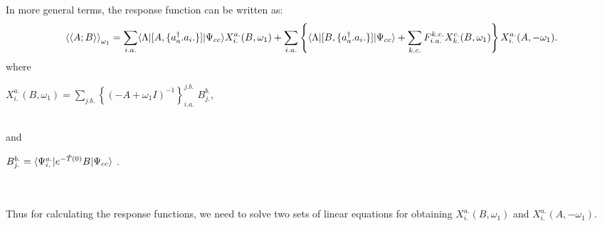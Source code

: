 In more general terms, the response function can be written as:
\begin{equation}
{\langle\langle A;B\rangle\rangle}_{\omega_1} = \sum_{i.a.} \langle \Lambda |\lbrack A,\{{a}^\dagger_a.a_i.\}\rbrack|  \Psi_{cc} \rangle{X^{a.}_{i.}}(B,\omega_1) + \sum_{i.a.}\left\{\langle \Lambda |\lbrack B,\{{a}^\dagger_a.a_i.\}\rbrack| \Psi_{cc} \rangle + \sum_{k.c.}F^{k.c.}_{i.a.}{X^{c.}_{k.}}(B,\omega_1)\right\}{X^{a.}_{i.}}(A,-\omega_1).
\end{equation}
where \centerline{${X^{a.}_{i.}}(B,\omega_1) = \sum_{j.b.}\left\{ {( -A + \omega_1I)}^{-1}\right\}^{j.b.}_{i.a.}\;B^{b.}_{j.},$}\\and \centerline{ $B^{b.}_{j.} = \langle \Psi^{a.}_{i.} |e^{-\hat{T}(0)}B| \Psi_{cc} \rangle$ .}\\\\
Thus for calculating the response functions, we need to solve two sets of
linear equations for obtaining ${X^{a.}_{i.}}(B,\omega_1)$ and
${X^{a.}_{i.}}(A,-\omega_1)$.
